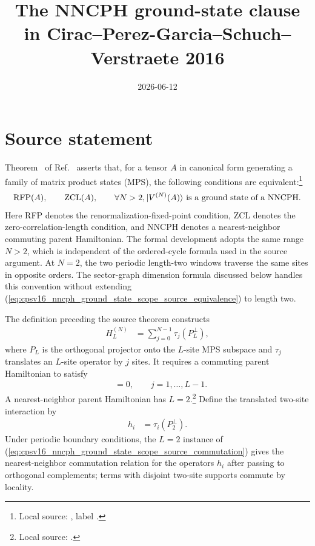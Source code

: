 \documentclass{article}
\title{The NNCPH ground-state clause in Cirac--Perez-Garcia--Schuch--Verstraete 2016}
\author{}
\date{2026-06-12}
\begin{document}
\maketitle
{}

\section{Source statement}

Theorem~ of Ref.~\cite{Cirac2016MPDO_arXiv} asserts that,
for a tensor $A$ in canonical form generating a family of matrix product states
(MPS), the following conditions are equivalent:\footnote{Local source:
, label
.}
\begin{align}
    \mathrm{RFP}(A),\qquad
    \mathrm{ZCL}(A),\qquad
    \forall N>2,
    |V^{(N)}(A)\rangle
    \text{ is a ground state of a NNCPH}.
    \label{eq:cpsv16_nncph_ground_state_scope_source_equivalence}
\end{align}
Here RFP denotes the renormalization-fixed-point condition, ZCL denotes the
zero-correlation-length condition, and NNCPH denotes a nearest-neighbor
commuting parent Hamiltonian. The formal development adopts the same range
$N>2$, which is independent of the ordered-cycle formula used in the source
argument. At $N=2$, the two periodic length-two windows traverse the same sites
in opposite orders. The sector-graph dimension formula discussed below handles
this convention without extending
(\ref{eq:cpsv16_nncph_ground_state_scope_source_equivalence}) to length two.

The definition preceding the source theorem constructs
\begin{align}
    H_L^{(N)}
        &=\sum_{j=0}^{N-1}\tau_j(P_L^\perp),
    \label{eq:cpsv16_nncph_ground_state_scope_parent_hamiltonian}
\end{align}
where $P_L$ is the orthogonal projector onto the $L$-site MPS subspace and
$\tau_j$ translates an $L$-site operator by $j$ sites. It requires a commuting
parent Hamiltonian to satisfy
\begin{align}
    [\tau_j(P_L),P_L]
        &=0,
        \qquad j=1,\ldots,L-1.
    \label{eq:cpsv16_nncph_ground_state_scope_source_commutation}
\end{align}
A nearest-neighbor parent Hamiltonian has $L=2$.\footnote{Local source:
.}
Define the translated two-site interaction by
\begin{align}
    h_i
        &=\tau_i(P_2^\perp).
    \label{eq:cpsv16_nncph_ground_state_scope_local_interaction}
\end{align}
Under periodic boundary conditions, the $L=2$ instance of
(\ref{eq:cpsv16_nncph_ground_state_scope_source_commutation}) gives the
nearest-neighbor commutation relation for the operators $h_i$ after passing to
orthogonal complements; terms with disjoint two-site supports commute by
locality.
\end{document}
